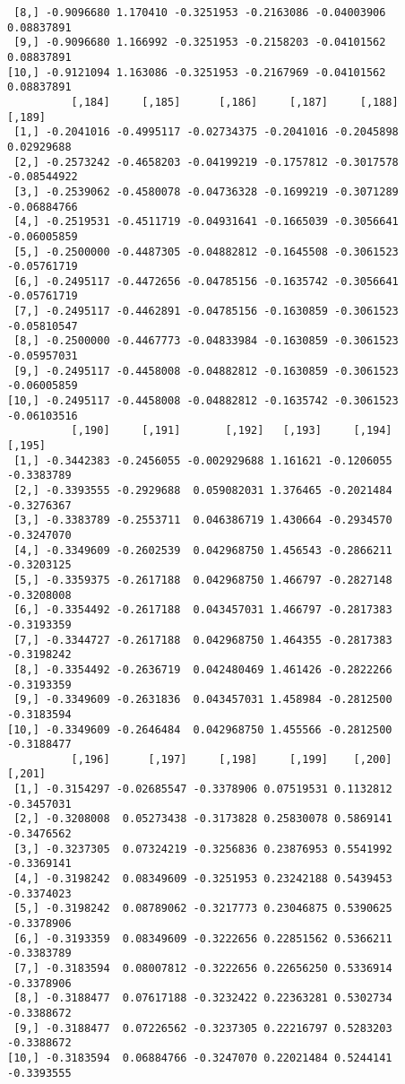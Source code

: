 \documentclass[
  letterpaper,
  DIV=11,
  numbers=noendperiod]{scrreprt}
\begin{document}
\begin{verbatim}
 [8,] -0.9096680 1.170410 -0.3251953 -0.2163086 -0.04003906  0.08837891
 [9,] -0.9096680 1.166992 -0.3251953 -0.2158203 -0.04101562  0.08837891
[10,] -0.9121094 1.163086 -0.3251953 -0.2167969 -0.04101562  0.08837891
          [,184]     [,185]      [,186]     [,187]     [,188]      [,189]
 [1,] -0.2041016 -0.4995117 -0.02734375 -0.2041016 -0.2045898  0.02929688
 [2,] -0.2573242 -0.4658203 -0.04199219 -0.1757812 -0.3017578 -0.08544922
 [3,] -0.2539062 -0.4580078 -0.04736328 -0.1699219 -0.3071289 -0.06884766
 [4,] -0.2519531 -0.4511719 -0.04931641 -0.1665039 -0.3056641 -0.06005859
 [5,] -0.2500000 -0.4487305 -0.04882812 -0.1645508 -0.3061523 -0.05761719
 [6,] -0.2495117 -0.4472656 -0.04785156 -0.1635742 -0.3056641 -0.05761719
 [7,] -0.2495117 -0.4462891 -0.04785156 -0.1630859 -0.3061523 -0.05810547
 [8,] -0.2500000 -0.4467773 -0.04833984 -0.1630859 -0.3061523 -0.05957031
 [9,] -0.2495117 -0.4458008 -0.04882812 -0.1630859 -0.3061523 -0.06005859
[10,] -0.2495117 -0.4458008 -0.04882812 -0.1635742 -0.3061523 -0.06103516
          [,190]     [,191]       [,192]   [,193]     [,194]     [,195]
 [1,] -0.3442383 -0.2456055 -0.002929688 1.161621 -0.1206055 -0.3383789
 [2,] -0.3393555 -0.2929688  0.059082031 1.376465 -0.2021484 -0.3276367
 [3,] -0.3383789 -0.2553711  0.046386719 1.430664 -0.2934570 -0.3247070
 [4,] -0.3349609 -0.2602539  0.042968750 1.456543 -0.2866211 -0.3203125
 [5,] -0.3359375 -0.2617188  0.042968750 1.466797 -0.2827148 -0.3208008
 [6,] -0.3354492 -0.2617188  0.043457031 1.466797 -0.2817383 -0.3193359
 [7,] -0.3344727 -0.2617188  0.042968750 1.464355 -0.2817383 -0.3198242
 [8,] -0.3354492 -0.2636719  0.042480469 1.461426 -0.2822266 -0.3193359
 [9,] -0.3349609 -0.2631836  0.043457031 1.458984 -0.2812500 -0.3183594
[10,] -0.3349609 -0.2646484  0.042968750 1.455566 -0.2812500 -0.3188477
          [,196]      [,197]     [,198]     [,199]    [,200]     [,201]
 [1,] -0.3154297 -0.02685547 -0.3378906 0.07519531 0.1132812 -0.3457031
 [2,] -0.3208008  0.05273438 -0.3173828 0.25830078 0.5869141 -0.3476562
 [3,] -0.3237305  0.07324219 -0.3256836 0.23876953 0.5541992 -0.3369141
 [4,] -0.3198242  0.08349609 -0.3251953 0.23242188 0.5439453 -0.3374023
 [5,] -0.3198242  0.08789062 -0.3217773 0.23046875 0.5390625 -0.3378906
 [6,] -0.3193359  0.08349609 -0.3222656 0.22851562 0.5366211 -0.3383789
 [7,] -0.3183594  0.08007812 -0.3222656 0.22656250 0.5336914 -0.3378906
 [8,] -0.3188477  0.07617188 -0.3232422 0.22363281 0.5302734 -0.3388672
 [9,] -0.3188477  0.07226562 -0.3237305 0.22216797 0.5283203 -0.3388672
[10,] -0.3183594  0.06884766 -0.3247070 0.22021484 0.5244141 -0.3393555

\end{verbatim}
\end{document}
